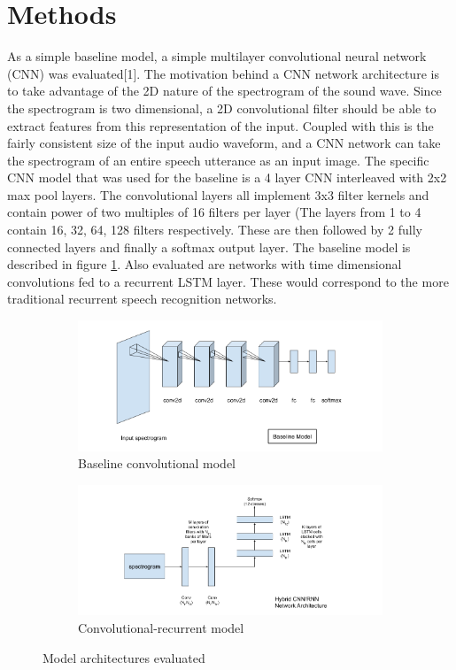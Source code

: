 \documentclass{article}
\begin{document}
\section{ Methods }
As a simple baseline model, a simple multilayer convolutional neural
network (CNN) was evaluated[1]. The motivation behind a CNN network
architecture is to take advantage of the 2D nature of the spectrogram
of the sound wave. Since the spectrogram is two dimensional, a 2D
convolutional filter should be able to extract features from this
representation of the input. Coupled with this is the fairly
consistent size of the input audio waveform, and a CNN network can
take the spectrogram of an entire speech utterance as an input
image. The specific CNN model that was used for the baseline is a 4
layer CNN interleaved with 2x2 max pool layers\cite{oxerin-baseline}. The convolutional
layers all implement 3x3 filter kernels and contain power of two
multiples of 16 filters per layer (The layers from 1 to 4 contain
16, 32, 64, 128 filters respectively. These are then followed by 2
fully connected layers and finally a softmax output layer. The
baseline model is described in figure \ref{fig:baseline}. Also
evaluated are networks with time dimensional convolutions fed to a
recurrent LSTM layer. These would correspond to the more traditional
recurrent speech recognition networks.
\begin{figure}
  \begin{subfigure}{.5\linewidth}
    \includegraphics[width=\linewidth]{images/baseline}
    \caption{Baseline convolutional model}
    \label{fig:baseline}
  \end{subfigure}%
  \begin{subfigure}{.5\linewidth}
    \includegraphics[width=\linewidth]{images/crnn}
    \caption{Convolutional-recurrent model}
    \label{fig:crnn}
  \end{subfigure}
  \caption{Model architectures evaluated}
\end{figure}
\end{document}

